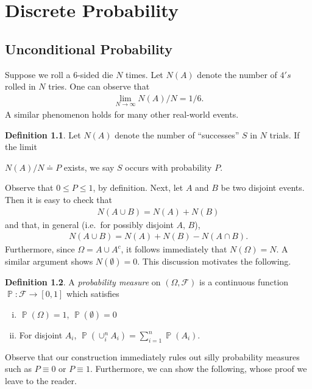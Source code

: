 \documentclass[12pt]{amsbook}
\newcommand{\filter}{\mathcal{F}}
\DeclareMathOperator{\prob}{\mathbb{P}}
\theoremstyle{plain}
\theoremstyle{definition}
\newtheorem*{definition}{Definition}
\theoremstyle{remark}
\numberwithin{equation}{section}  %
\begin{document}
\chapter{Discrete Probability}
\section{Unconditional Probability}
Suppose we roll a $6$-sided die $N$ times. Let $N(A)$ denote the number of $4's$
rolled in $N$ tries. One can observe that
\begin{align*}
	\lim_{N \to \infty} N(A)/N = 1/6.
\end{align*}
A similar phenomenon holds for many other real-world events.

\begin{definition}
	Let $N(A)$ denote the number of ``successes'' $S$ in $N$ trials. If the
	limit
	
	
 $N(A)/N \doteq P$ exists, we say $S$ occurs with probability $P$.
\end{definition}
Observe that $ 0 \le P \le 1$, by definition.
Next, let $A$ and $B$ be two disjoint events. Then
it is easy to check that
\begin{align*}
	N(A \cup B) = N(A) + N(B)
\end{align*}
and that, in general (i.e.\ for possibly disjoint $A$, $B$),
\begin{align*}
	N(A \cup B) = N(A) + N(B) - N(A \cap B).
\end{align*}
Furthermore, since $\Omega = A \cup A^c$, it follows immediately
that $N(\Omega) = N$. A similar argument shows $N(\emptyset) = 0$.
This discussion motivates the following.
\begin{definition}
	A \emph{probability measure} on $(\Omega, \filter)$ is a continuous function
	$\prob: \filter \to [0,1]$ which satisfies
	\begin{enumerate}[(i)]
		\item
			$\prob(\Omega) = 1$, $\prob(\emptyset) = 0$
		\item
			For disjoint $A_i$, $\prob(\cup_i^n A_i) = \sum_{i = 1}^n 
			\prob(A_i)$.
	\end{enumerate}
\end{definition}
Observe that our construction immediately rules out silly probability
measures such as $P \equiv 0$ or $P \equiv 1$. Furthermore,
we can show the following, whose proof we leave to the reader.
\end{document}
